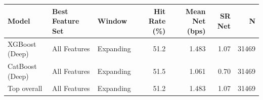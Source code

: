 \begin{tabular}{lllrrrr}
\toprule
Model & Best Feature Set & Window & Hit Rate (\%) & Mean Net (bps) & SR Net & N \\
\midrule
XGBoost (Deep) & All Features & Expanding & 51.2 & 1.483 & 1.07 & 31469 \\
CatBoost (Deep) & All Features & Expanding & 51.5 & 1.061 & 0.70 & 31469 \\
\midrule
Top overall & All Features & Expanding & 51.2 & 1.483 & 1.07 & 31469 \\
\bottomrule
\end{tabular}
